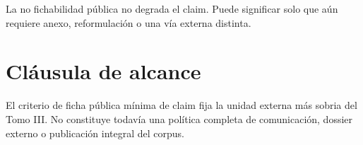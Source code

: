 \begin{observation}
La no fichabilidad pública no degrada el claim. Puede significar solo que aún requiere anexo, reformulación o una vía externa distinta.
\end{observation}

\section{Cláusula de alcance}
\begin{observation}
El criterio de ficha pública mínima de claim fija la unidad externa más sobria del Tomo III. No constituye todavía una política completa de comunicación, dossier externo o publicación integral del corpus.
\end{observation}

